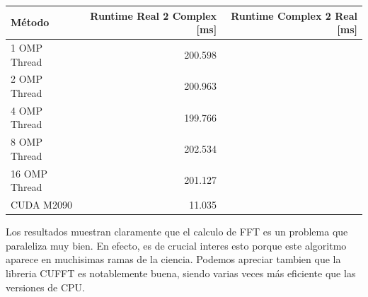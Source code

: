 \begin{table}
    \begin{tabular}{l|r|r}
        \textbf{M\'etodo} & \textbf{ Runtime Real 2 Complex [ms] } & \textbf{  Runtime Complex 2 Real [ms] } \\ \hline
        1 OMP Thread         & 200.598     & \\
        2 OMP Thread          & 200.963      &\\
        4 OMP Thread          & 199.766      &\\
        8 OMP Thread  & 202.534      &      \\
        16 OMP Thread & 201.127      &  \\
        CUDA M2090 & 11.035          &
    \end{tabular}
\end{table}

Los resultados muestran claramente que el calculo de FFT es un problema que paraleliza muy bien. En efecto,
es de crucial interes esto porque este algoritmo aparece en muchisimas ramas de la ciencia. Podemos apreciar
tambien que la libreria CUFFT es notablemente buena, siendo varias veces m\'as eficiente que las versiones
de CPU. 
